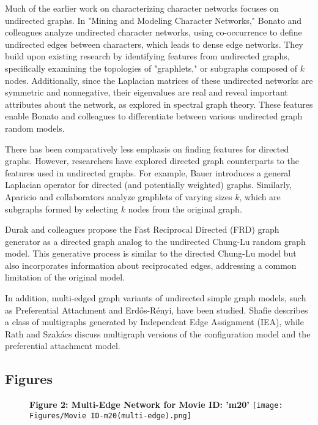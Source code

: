 \documentclass{article} %
\begin{document}
Much of the earlier work on characterizing character networks focuses on undirected graphs. In "Mining and Modeling Character Networks," Bonato and colleagues analyze undirected character networks, using co-occurrence to define undirected edges between characters, which leads to dense edge networks. They build upon existing research by identifying features from undirected graphs, specifically examining the topologies of "graphlets," or subgraphs composed of \(k\) nodes. Additionally, since the Laplacian matrices of these undirected networks are symmetric and nonnegative, their eigenvalues are real and reveal important attributes about the network, as explored in spectral graph theory. These features enable Bonato and colleagues to differentiate between various undirected graph random models.

There has been comparatively less emphasis on finding features for directed graphs. However, researchers have explored directed graph counterparts to the features used in undirected graphs. For example, Bauer introduces a general Laplacian operator for directed (and potentially weighted) graphs. Similarly, Aparicio and collaborators analyze graphlets of varying sizes \(k\), which are subgraphs formed by selecting \(k\) nodes from the original graph.

Durak and colleagues propose the Fast Reciprocal Directed (FRD) graph generator as a directed graph analog to the undirected Chung-Lu random graph model. This generative process is similar to the directed Chung-Lu model but also incorporates information about reciprocated edges, addressing a common limitation of the original model.

In addition, multi-edged graph variants of undirected simple graph models, such as Preferential Attachment and Erdős-Rényi, have been studied. Shafie describes a class of multigraphs generated by Independent Edge Assignment (IEA), while Rath and Szakács discuss multigraph versions of the configuration model and the preferential attachment model.

\newpage
\subsection{Figures}

\begin{figure}[ht]
    \centering
    \textbf{Figure 2: Multi-Edge Network for Movie ID: 'm20'}
    \texttt{[image: Figures/Movie ID-m20(multi-edge).png]}
\end{figure}
\end{document}
